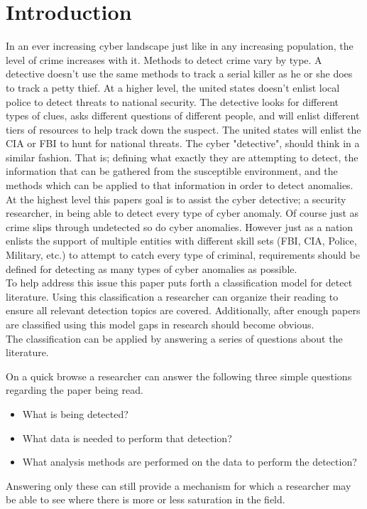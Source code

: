 \documentclass[conference]{IEEEtran}
\begin{document}
\section{Introduction}
In an ever increasing cyber landscape just like in any increasing population, the level of crime increases with it. Methods to detect crime vary by type. A detective doesn't use the same methods to track a serial killer as he or she does to track a petty thief. At a higher level, the united states doesn't enlist local police to detect threats to national security. The detective looks for different types of clues, asks different questions of different people, and will enlist different tiers of resources to help track down the suspect. The united states will enlist the CIA or FBI to hunt for national threats. The cyber "detective", should think in a similar fashion. That is; defining what exactly they are attempting to detect, the information that can be gathered from the susceptible environment, and the methods which can be applied to that information in order to detect anomalies. \\
At the highest level this papers goal is to assist the cyber detective; a security researcher, in being able to detect every type of cyber anomaly. Of course just as crime slips through undetected so do cyber anomalies. However just as a nation enlists the support of multiple entities with different skill sets (FBI, CIA, Police, Military, etc.) to attempt to catch every type of criminal, requirements should be defined for detecting as many types of cyber anomalies as possible. \\
To help address this issue this paper puts forth a classification model for detect literature. Using this classification a researcher can organize their reading to ensure all relevant detection topics are covered. Additionally, after enough papers are classified using this model gaps in research should become obvious.\\
The classification can be applied by answering a series of questions about the literature.

On a quick browse a researcher can answer the following three simple questions regarding the paper being read. 
\begin{itemize}
    \item What is being detected?
    \item What data is needed to perform that detection?
    \item What analysis methods are performed on the data to perform the detection?
\end{itemize}
Answering only these can still provide a mechanism for which a researcher may be able to see where there is more or less saturation in the field.
\end{document}
